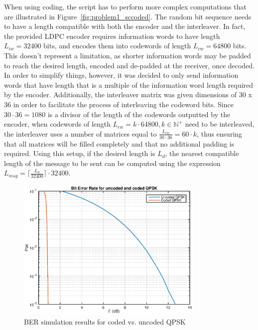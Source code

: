 \documentclass[10pt]{article}
\begin{document}
When using coding, the script has to perform more complex computations that are illustrated in Figure~\ref{fig:problem1_sccoded}. The random bit sequence needs to have a length compatible with both the encoder and the interleaver. In fact, the provided LDPC encoder requires information words to have length $L_{iw} = 32400$ bits, and encodes them into codewords of length $L_{cw} = 64800$ bits. This doesn't represent a limitation, as shorter information words may be padded to reach the desired length, encoded and de-padded at the receiver, once decoded. In order to simplify things, however, it was decided to only send information words that have length that is a multiple of the information word length required by the encoder. Additionally, the interleaver matrix was given dimensions of 30 x 36 in order to facilitate the process of interleaving the codeword bits. Since $30 \cdot 36 = 1080$ is a divisor of the length of the codewords outputted by the encoder, when codewords of length $L_{cw} = k \cdot 64800, k \in \mathbb{N^{+}}$ need to be interleaved, the interleaver uses a number of matrices equal to $\frac{L_{cw}}{30\cdot36} = 60 \cdot k$, thus ensuring that all matrices will be filled completely and that no additional padding is required. Using this setup, if the desired length is $L_d$, the nearest compatible length of the message to be sent can be computed using the expression $L_{msg} = \lceil \frac{L_{d}}{32400} \rceil \cdot 32400$.


\begin{figure}
	\centering
	\includegraphics[width = 0.8\textwidth]{problem1}
	\caption{BER simulation results for coded vs. uncoded QPSK}
	\label{fig:problem1_pbit}
\end{figure}
\end{document}
